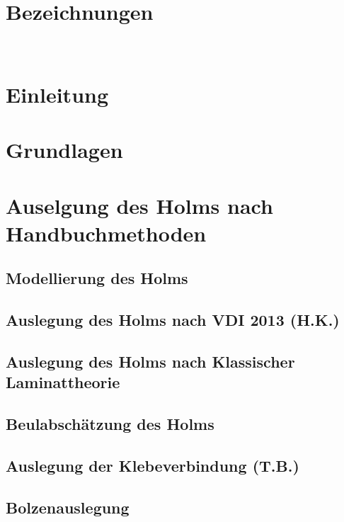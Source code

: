 \documentclass[a4paper,twoside,11pt]{article}
\begin{document}
	

	


\newpage

\newpage
\tableofcontents
\newpage
\section{Bezeichnungen}

\newpage ~
\newpage ~
\newpage
\section{Einleitung}

\newpage
\section{Grundlagen}

\newpage

\section{Auselgung des Holms nach Handbuchmethoden}
\subsection{Modellierung des Holms}

\newpage
\subsection{Auslegung des Holms nach VDI 2013 (H.K.)}\label{VDI}
\label{VDI2013}

\newpage
\subsection{Auslegung des Holms nach Klassischer Laminattheorie}\label{Puck}

\newpage
\subsection{Beulabschätzung des Holms}

\newpage
\subsection{Auslegung der Klebeverbindung (T.B.)}

\newpage
\subsection{Bolzenauslegung}

\newpage
\end{document}
